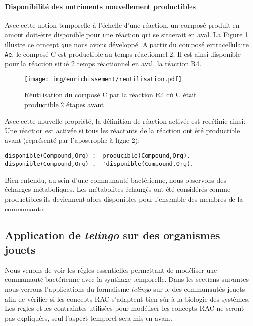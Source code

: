 \documentclass[../main.tex]{subfiles}
\begin{document}
\paragraph*{Disponibilité des nutriments nouvellement productibles}
Avec cette notion temporelle à l'échelle d'une réaction, un composé produit en amont doit-être disponible pour une réaction qui se situerait en aval. La Figure \ref{disponible} illustre ce concept que nous avons développé. A partir du composé extracellulaire \texttt{Ae}, le composé C est productible au temps réactionnel 2. Il est ainsi disponible pour la réaction situé 2 temps réactionnel en aval, la réaction R4. 

    \begin{figure}[H]
        \begin{center}
            \texttt{[image: img/enrichissement/reutilisation.pdf]}
                \caption{Réutilisation du composé C par la réaction R4 où C était productible 2 étapes avant }
            \label{disponible}
        \end{center}
    \end{figure}
    
Avec cette nouvelle propriété, la définition de réaction activée est redéfinie ainsi: Une réaction est activée si tous les réactants de la réaction ont été productible avant (représenté par l'apostrophe à ligne 2):

\begin{lstlisting}
disponible(Compound,Org) :- producible(Compound,Org).
disponible(Compound,Org) :- 'disponible(Compound,Org).
\end{lstlisting} 

Bien entendu, au sein d'une communauté bactérienne, nous observons des échanges métaboliques. Les métabolites échangés ont été considérés comme productibles ils deviennent alors disponibles pour l'ensemble des membres de la communauté.

\subsection{Application de \textit{telingo} sur des organismes jouets}
Nous venons de voir les règles essentielles permettant de modéliser une communauté bactérienne avec la synthaxe temporelle. Dans les sections suivantes nous verrons l'applications du formalisme \textit{telingo} sur le des communautés jouets afin de vérifier si les concepts RAC s'adaptent bien sûr à la biologie des systèmes. Les règles et les contraintes utilisées pour modéliser les concepts RAC ne seront pas expliquées, seul l'aspect temporel sera mis en avant.
\end{document}
